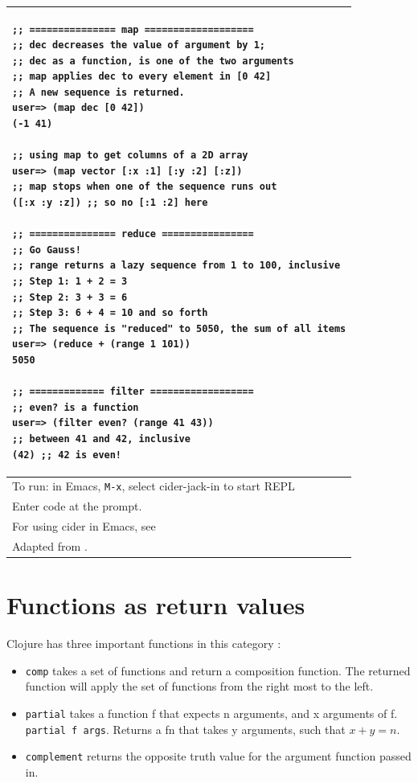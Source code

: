 \documentclass[12pt]{article}
\begin{document}
\begin{tabular}{|p{}|}
\hline
\begin{verbatim}
;; =============== map ===================
;; dec decreases the value of argument by 1;
;; dec as a function, is one of the two arguments
;; map applies dec to every element in [0 42]
;; A new sequence is returned.
user=> (map dec [0 42])
(-1 41)

;; using map to get columns of a 2D array
user=> (map vector [:x :1] [:y :2] [:z])
;; map stops when one of the sequence runs out
([:x :y :z]) ;; so no [:1 :2] here

;; =============== reduce ================
;; Go Gauss!
;; range returns a lazy sequence from 1 to 100, inclusive
;; Step 1: 1 + 2 = 3
;; Step 2: 3 + 3 = 6
;; Step 3: 6 + 4 = 10 and so forth
;; The sequence is "reduced" to 5050, the sum of all items
user=> (reduce + (range 1 101))
5050

;; ============= filter ==================
;; even? is a function
user=> (filter even? (range 41 43))
;; between 41 and 42, inclusive
(42) ;; 42 is even!
\end{verbatim}
\\
\hline
To run: in Emacs, \texttt{M-x}, select cider-jack-in to start REPL\\
Enter code at the prompt.\\
For using cider in Emacs, see \cite{brave2015}\\
\hline
Adapted from \cite{empty}.\\
\hline
\end{tabular}



\part{Functions as return values}

Clojure has three important functions in this category \cite{fogus2014joy}:
\begin{itemize}
\item \texttt{comp} takes a set of functions and return a composition function. The returned function will apply the set of functions from the right most to the left.
\item \texttt{partial} takes a function f that expects n arguments, and x arguments of f. \texttt{partial f args}. Returns a fn that takes y arguments, such that $x + y = n$.
\item \texttt{complement} returns the opposite truth value for the argument function passed in.
\end{itemize}
\end{document}

